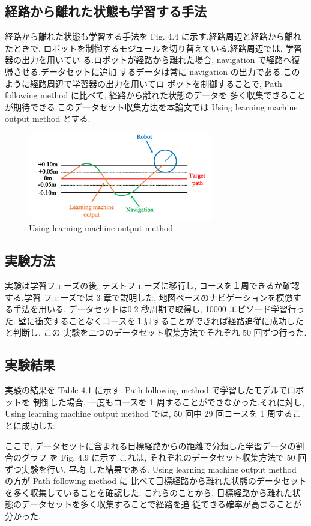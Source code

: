 \documentclass{jarticle}
\begin{document}
\subsection{経路から離れた状態も学習する手法}
経路から離れた状態も学習する手法を Fig. 4.4 に示す.経路周辺と経路から離れたときで, 
ロボットを制御するモジュールを切り替えている.経路周辺では, 学習器の出力を用いてい
る.ロボットが経路から離れた場合,  navigation で経路へ復帰させる.データセットに追加
するデータは常に navigation の出力である.このように経路周辺で学習器の出力を用いてロ
ボットを制御することで,  Path following method に比べて, 経路から離れた状態のデータを
多く収集できることが期待できる.このデータセット収集方法を本論文では Using learning
machine output method とする.

\begin{figure}[h!]
  \centering
   \includegraphics[height=38mm]{./figs/dl_use.png}
   \caption{Using learning machine output method}
\end{figure}

\subsection{実験方法}
実験は学習フェーズの後, テストフェーズに移行し, コースを１周できるか確認する.学習
フェーズでは 3 章で説明した, 地図ベースのナビゲーションを模倣する手法を用いる.
データセットは0.2 秒周期で取得し,  10000 エピソード学習行った.
壁に衝突することなくコースを１周することができれば経路追従に成功したと判断し, この
実験を二つのデータセット収集方法でそれぞれ 50 回ずつ行った.

\subsection{実験結果}
実験の結果を Table 4.1 に示す. Path following method で学習したモデルでロボットを
制御した場合, 一度もコースを 1 周することができなかった.それに対し,  Using learning
machine output method では,  50 回中 29 回コースを 1 周することに成功した

ここで, データセットに含まれる目標経路からの距離で分類した学習データの割合のグラフ
を Fig. 4.9 に示す.これは, それぞれのデータセット収集方法で 50 回ずつ実験を行い, 平均
した結果である. Using learning machine output method の方が Path following method に
比べて目標経路から離れた状態のデータセットを多く収集していることを確認した.
これらのことから, 目標経路から離れた状態のデータセットを多く収集することで経路を追
従できる確率が高まることが分かった.
\end{document}
